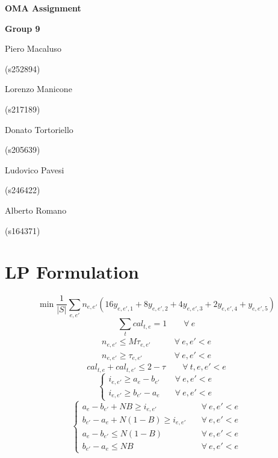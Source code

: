 \documentclass[11pt, a4paper, leqno]{article}
\newcommand{\nome}[2]{
\begin{minipage}[t]{0.185\linewidth}
	\centering #1\par
	\centering\small (#2)\par
\end{minipage}
}
\begin{document}
	
	\begin{center}
		{\huge\textbf{OMA Assignment}}\par
		\vspace{0.3em}
		{\large\textbf{Group 9}}\par
		\vspace{1em}
		\nome{Piero Macaluso}{s252894}
		\nome{Lorenzo Manicone}{s217189}
		\nome{Donato Tortoriello}{s205639}
		\nome{Ludovico Pavesi}{s246422}
		\nome{Alberto Romano}{s164371}
	\end{center}

	\section{LP Formulation}

	\begin{equation}
		\tag{Objective function}
		\label{of}
		\min\frac{1}{\left|S\right|
		}\sum_{e,e'} n_{e,e'}\left(16y_{e,e',1}+8y_{e,e',2}+4y_{e,e',3}+2y_{e,e',4}+y_{e,e',5}\right)
	\end{equation}
	\begin{equation}
		\label{apply}
		\sum_{t} cal_{t,e} = 1 \qquad\forall\ e
	\end{equation}
	\begin{equation}
	\label{conflict1}
	\begin{aligned}
	n_{e,e'} \leq M\tau_{e,e'} &\qquad \forall\ e,e'<e \\
	n_{e,e'} \geq \tau_{e,e'} &\qquad \forall\ e,e'<e
	\end{aligned}
	\end{equation}
	\begin{equation}
	\label{conflict2}
	cal_{t,e}+cal_{t,e'} \leq 2 - \tau \qquad \forall\ t,e,e'<e
	\end{equation}
	\begin{equation}
	\label{distance1}
	\begin{cases}
	i_{e,e'} \geq a_e-b_{e'}&\quad \forall\ e,e'<e\\
	i_{e,e'} \geq b_{e'}-a_e&\quad \forall\ e,e'<e
	\end{cases}
	\end{equation}
	\begin{equation}
	\begin{cases}
	\label{distance2}
	a_e-b_{e'} + NB \geq i_{e,e'}&\quad \forall\ e,e'<e\\
	b_{e'}-a_e + N(1-B) \geq i_{e,e'}&\quad \forall\ e,e'<e\\
	a_e-b_{e'} \leq N(1-B)&\quad \forall\ e,e'<e\\
	b_{e'}-a_e \leq NB&\quad \forall\ e,e'<e
	\end{cases}
	\end{equation}
\end{document}
